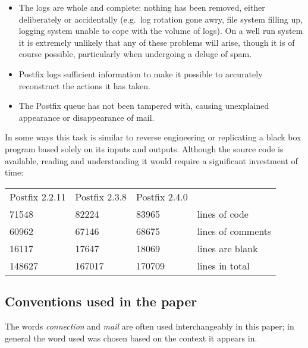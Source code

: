 \documentclass[a4paper,12pt,draft]{article}
\begin{document}
\begin{itemize}

    \item The logs are whole and complete: nothing has been removed, either
        deliberately or accidentally (e.g.\ log rotation gone awry, file
        system filling up, logging system unable to cope with the volume of
        logs).  On a well run system it is extremely unlikely that any of
        these problems will arise, though it is of course possible,
        particularly when undergoing a deluge of spam.

    \item Postfix logs sufficient information to make it possible to
        accurately reconstruct the actions it has taken.

    \item The Postfix queue has not been tampered with, causing unexplained
        appearance or disappearance of mail.

\end{itemize}

In some ways this task is similar to reverse engineering or replicating a
black box program based solely on its inputs and outputs.  Although the
source code is available, reading and understanding it would require a
significant investment of time:

\begin{tabular}[]{llll}

    Postfix 2.2.11  & Postfix 2.3.8   & Postfix 2.4.0 &                   \\
    71548           & 82224           & 83965         & lines of code     \\
    60962           & 67146           & 68675         & lines of comments \\
    16117           & 17647           & 18069         & lines are blank   \\
    148627          & 167017          & 170709        & lines in total    \\

\end{tabular}


\subsection{Conventions used in the paper}

The words \textit{connection\/} and \textit{mail\/} are often used
interchangeably in this paper; in general the word used was chosen based on
the context it appears in.
\end{document}
